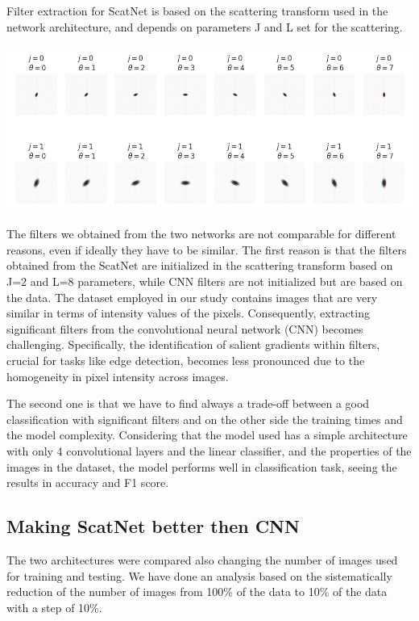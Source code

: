 \documentclass[11pt]{article}
\newenvironment{Figure}
  {\par\medskip\noindent\minipage{\linewidth}}
  {\endminipage\par\medskip}
\begin{document}
\begin{multicols*}{2}
Filter extraction for ScatNet is based on the scattering transform used in the network architecture, and depends on parameters J and L set for the scattering.

\begin{Figure}
    \centering
    \includegraphics[width=\linewidth]{images/ScatNet_Kernels_Wavelets.png}
    \label{fig:scatnet-filter}
\end{Figure}

The filters we obtained from the two networks are not comparable for different reasons, even if ideally they have to be similar. The first reason is that the filters obtained from the ScatNet are initialized in the scattering transform based on J=2 and L=8 parameters, while CNN filters are not initialized but are based on the data. The dataset employed in our study contains images that are very similar in terms of intensity values of the pixels. Consequently, extracting significant filters from the convolutional neural network (CNN) becomes challenging. Specifically, the identification of salient gradients within filters, crucial for tasks like edge detection, becomes less pronounced due to the homogeneity in pixel intensity across images.

The second one is that we have to find always a trade-off between a good classification with significant filters and on the other side the training times and the model complexity. Considering that the model used has a simple architecture with only 4 convolutional layers and the linear classifier, and the properties of the images in the dataset, the model performs well in classification task, seeing the results in accuracy and F1 score.

\subsection{Making ScatNet better then CNN}
The two architectures were compared also changing the number of images used for training and testing. We have done an analysis based on the sistematically reduction of the number of images from 100\% of the data to 10\% of the data with a step of 10\%.


\end{multicols*}
\end{document}
